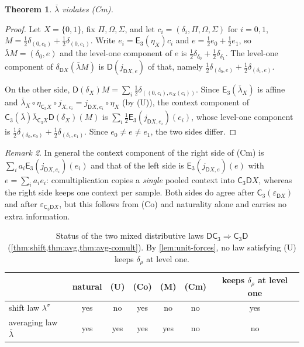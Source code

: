 \documentclass[11pt]{article}
\newtheorem{theorem}{Theorem}[section]
\theoremstyle{definition}
\theoremstyle{remark}
\newtheorem{remark}[theorem]{Remark}
\newcommand{\D}{\mathsf{D}}
\newcommand{\C}{\mathsf{C}}
\newcommand{\E}{\mathsf{E}}
\newcommand{\lb}{\bar\lambda}
\newcommand{\ls}{\lambda^{\sigma}}
\begin{document}
\begin{theorem}\label{thm:avg-comult}
$\lb$ violates (Cm).
\end{theorem}
\begin{proof}
Let $X=\{0,1\}$, fix $\Pi,\Omega,\Sigma$, and let $c_i=(\delta_{i},\Pi,\Omega,\Sigma)$ for $i=0,1$,
$M=\tfrac12\delta_{(0,c_0)}+\tfrac12\delta_{(0,c_1)}$. Write $e_i=\E_3(\eta_X)c_i$ and
$e=\tfrac12e_0+\tfrac12e_1$, so $\lb M=(\delta_0,e)$ and the level-one component of $e$ is
$\tfrac12\delta_{\delta_0}+\tfrac12\delta_{\delta_1}$. The level-one component of
$\delta_{\D X}(\lb M)$ is $\D(j_{\D X,e})$ of that, namely
$\tfrac12\delta_{(\delta_0,e)}+\tfrac12\delta_{(\delta_1,e)}$.

On the other side, $\D(\delta_X)M=\sum_i\tfrac12\delta_{((0,c_i),\kappa_X(c_i))}$. Since
$\E_3(\lb_X)$ is affine and $\lb_X\circ\eta_{\C_3X}\circ j_{X,c_i}=j_{\D X,e_i}\circ\eta_X$
(by (U)), the context component of $\C_3(\lb)\lb_{\C_3X}\D(\delta_X)(M)$ is
$\sum_i\tfrac12\E_3(j_{\D X,e_i})(e_i)$, whose level-one component is
$\tfrac12\delta_{(\delta_0,e_0)}+\tfrac12\delta_{(\delta_1,e_1)}$. Since $e_0\ne e\ne e_1$, the two sides
differ.
\end{proof}

\begin{remark}
In general the context component of the right side of (Cm) is $\sum_ia_i\E_3(j_{\D X,e_i})(e_i)$ and
that of the left side is $\E_3(j_{\D X,e})(e)$ with $e=\sum_ia_ie_i$: comultiplication copies a
\emph{single} pooled context into $\C_3\D X$, whereas the right side keeps one context per sample.
Both sides do agree after $\C_3(\varepsilon_{\D X})$ and after $\varepsilon_{\C_3\D X}$, but this
follows from (Co) and naturality alone and carries no extra information.
\end{remark}

\begin{table}[t]
\centering
\begin{tabular}{@{}lcccccc@{}}
\toprule
& natural & (U) & (Co) & (M) & (Cm) & keeps $\delta_\rho$ at level one\\
\midrule
shift law $\ls$ & yes & no & yes & no & no & yes\\
averaging law $\lb$ & yes & yes & yes & yes & no & no\\
\bottomrule
\end{tabular}
\caption{Status of the two mixed distributive laws $\D\C_3\Rightarrow\C_3\D$
(\cref{thm:shift,thm:avg,thm:avg-comult}). By \cref{lem:unit-forces}, no law satisfying (U) keeps
$\delta_\rho$ at level one.}
\label{tab:status}
\end{table}
\end{document}
